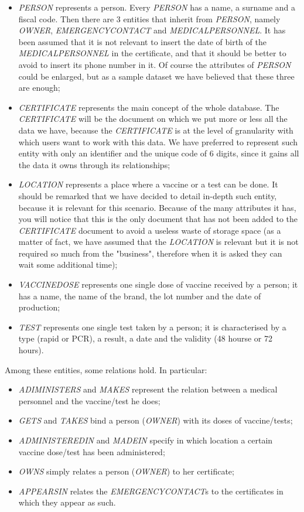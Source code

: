 \documentclass{article}
\begin{document}
\begin{itemize}
    \item \textit{PERSON} represents a person. Every \textit{PERSON} has a name, a surname and a fiscal code. Then there are 3 entities that inherit from \textit{PERSON}, namely \textit{OWNER}, \textit{EMERGENCYCONTACT} and \textit{MEDICALPERSONNEL}. It has been assumed that it is not relevant to insert the date of birth of the \textit{MEDICALPERSONNEL} in the certificate, and that it should be better to avoid to insert its phone number in it. Of course the attributes of \textit{PERSON} could be enlarged, but as a sample dataset we have believed that these three are enough;
    \item \textit{CERTIFICATE} represents the main concept of the whole database. The \textit{CERTIFICATE} will be the document on which we put more or less all the data we have, because the \textit{CERTIFICATE} is at the level of granularity  with which users want to work with this data. We have preferred to represent such entity with only an identifier and the unique code of 6 digits, since it gains all the data it owns through its relationships;
    \item \textit{LOCATION} represents a place where a vaccine or a test can be done. It should be remarked that we have decided to detail in-depth such entity, because it is relevant for this scenario. Because of the many attributes it has, you will notice that this is the only document that has not been added to the \textit{CERTIFICATE} document to avoid a useless waste of storage space (as a matter of fact, we have assumed that the \textit{LOCATION} is relevant but it is not required so much from the "business", therefore when it is asked they can wait some additional time);
    \item \textit{VACCINEDOSE} represents one single dose of vaccine received by a person; it has a name, the name of the brand, the lot number and the date of production;
    \item \textit{TEST} represents one single test taken by a person; it is characterised by a type (rapid or PCR), a result, a date and the validity (48 hourse or 72 hours).
\end{itemize}
Among these entities, some relations hold. In particular:
\begin{itemize}
    \item \textit{ADIMINISTERS} and \textit{MAKES} represent the relation between a medical personnel and the vaccine/test he does;
    \item \textit{GETS} and \textit{TAKES} bind a person (\textit{OWNER}) with its doses of vaccine/tests;
    \item \textit{ADMINISTEREDIN} and \textit{MADEIN} specify in which location a certain vaccine dose/test has been administered;
    \item \textit{OWNS} simply relates a person (\textit{OWNER}) to her certificate;
    \item \textit{APPEARSIN} relates the \textit{EMERGENCYCONTACT}s to the certificates in which they appear as such.
\end{itemize}
\newpage
\end{document}
